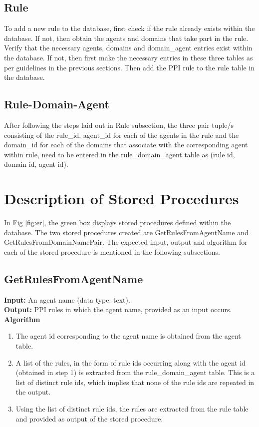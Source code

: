 \documentclass[msc,deptreport,ai]{infthesis}      %
\begin{document}
\subsection{Rule}
	To add a new rule to the database, first check if the rule already exists within the database. If not, then obtain the agents and domains that take part in the rule. Verify that the necessary agents, domains and domain\_agent entries exist within the database. If not, then first make the necessary entries in these three tables as per guidelines in the previous sections. Then add the PPI rule to the rule table in the database. 
	\subsection{Rule-Domain-Agent}
	After following the steps laid out in Rule subsection, the three pair tuple/s consisting of the rule\_id, agent\_id for each of the agents in the rule and the domain\_id for each of the domains that associate with the corresponding agent within rule, need to be entered in the rule\_domain\_agent table as (rule id, domain id, agent id).
\section{Description of Stored Procedures}
 In Fig \ref{fig:er}, the green box displays stored procedures defined within the database. The two stored procedures created are GetRulesFromAgentName and GetRulesFromDomainNamePair. The expected input, output and algorithm for each of the stored procedure is mentioned in the following subsections.
 \subsection{GetRulesFromAgentName}
 \textbf{Input:} An agent name (data type: text).\\
 \textbf{Output:} PPI rules in which the agent name, provided as an input occurs.\\ 
 \textbf{Algorithm} 
 \begin{enumerate}
 	\item The agent id corresponding to the agent name is obtained from the agent table. 
 	\item A list of the rules, in the form of rule ids occurring along with the agent id (obtained in step 1) is extracted from the rule\_domain\_agent table. This is a list of distinct rule ids, which implies that none of the rule ids are repeated in the output.
 	\item Using the list of distinct rule ids, the rules are extracted from the rule table and provided as output of the stored procedure.
 \end{enumerate}
\end{document}
